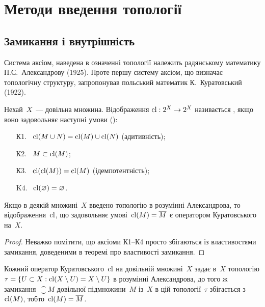 \chapter{Методи введення топології}

\section{Замикання і внутрішність}

Система аксіом, наведена в означенні топології належить
радянському математику П.С.~Александрову (1925). Проте
першу систему аксіом, що визначає топологічну структуру,
запропонував польський математик К.~Куратовський (1922).

\begin{definition}
Нехай~$X$~--- довільна множина. Відображення
$\operatorname{cl}: 2^X \to 2^X$ називається , якщо воно задовольняє наступні
умови ():
\begin{enumerate}
\item[К1.]~$\operatorname{cl}(M \cup N) = \operatorname{cl}(M) \cup \operatorname{cl}(N)$ (адитивність);
\item[К2.]~$M \subset \operatorname{cl}(M)$;
\item[К3.]~$\operatorname{cl}(\operatorname{cl}(M)) = \operatorname{cl}(M)$ (ідемпотентність);
\item[K4.]~$\operatorname{cl}(\varnothing) = \varnothing$.
\end{enumerate}
\end{definition}

\begin{theorem}
Якщо в деякій множині~$X$ введено топологію в
розумінні Александрова, то відображення~$\operatorname{cl}$, що
задовольняє умові~$\operatorname{cl} (M) = \overline{M}$ є оператором Куратовського
на~$X$.
\end{theorem}

\begin{proof}
Неважко помітити, що аксіоми К1--К4 просто
збігаються із властивостями замикання, доведеними в
теоремі про властивості замикання.
\end{proof}

\begin{theorem}
Кожний оператор Куратовського~$\operatorname{cl}$ на
довільній множині~$X$ задає в~$X$ топологію
$\tau = \{ U \subset X: \operatorname{cl}(X \setminus U) = X \setminus U\}$ в розумінні Александрова, до
того ж замикання~$\closure{M}$ довільної підмножини~$M$ із~$X$ в цій
топології~$\tau$ збігається з~$\operatorname{cl}(M)$, тобто~$\operatorname{cl} (M) = \overline{M}$.
\end{theorem}

